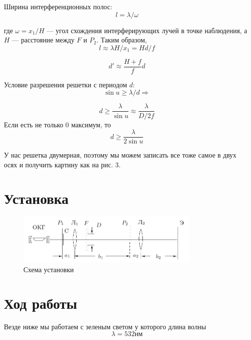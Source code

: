 \documentclass[a4paper, 12pt]{article}%
\begin{document}
Ширина интерференционных полос:
\begin{equation}
l = \lambda/\omega
\end{equation} 

где $\omega = x_1/H$ --- угол схождения интерферирующих лучей в точке наблюдения, а $H$ --- расстояние между $F$ и $P_2$. Таким образом, 
\begin{equation}
l \approx \lambda H/x_1 = H d/f
\end{equation}

\begin{equation}
d' \approx \dfrac{H + f}{f} d
\end{equation}

Условие разрешения решетки с периодом $d$:
\begin{equation}
\sin u \geqslant \lambda/d \Rightarrow 
\end{equation}
  
\begin{equation}
d \geqslant \dfrac{\lambda}{\sin u} \approx \dfrac{\lambda}{D/2f}
\end{equation}
Если есть не только 0 максимум, то 
\begin{equation}
d \geqslant \dfrac{\lambda}{2 \sin u}
\end{equation}

У нас решетка двумерная, поэтому мы можем записать все тоже самое в двух осях и получить картину как на рис. 3.
\section{Установка}

\begin{figure}[h]
\begin{center}
\includegraphics[width = 0.8\textwidth]{4.png}
\caption{Схема установки}
\end{center}
\end{figure}

\section{Ход работы}
Везде ниже мы работаем с зеленым светом у которого длина волны 
\[\lambda = 532 \text{нм}\]
\end{document}
